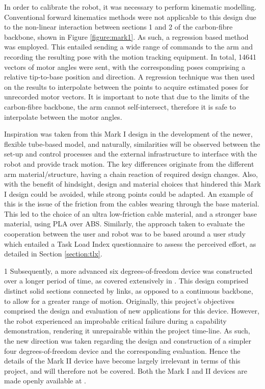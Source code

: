 \documentclass[11pt]{article}
\begin{document}
In order to calibrate the robot, it was necessary to perform kinematic modelling. Conventional forward
kinematics methods were not applicable to this design due to the non-linear interaction between sections 1 and 2
of the carbon-fibre backbone, shown in Figure \ref{figure:mark1}. As such, a regression based method was employed.
This entailed sending a wide range of commands to the arm and recording the resulting pose with the
motion tracking equipment. In total, 14641 vectors of motor angles were sent, with the corresponding
poses comprising a relative tip-to-base position and direction. A regression technique
was then used on the results to interpolate between the points to acquire estimated poses for unrecorded
motor vectors. It is important to note that due to the limits
of the carbon-fibre backbone, the arm cannot self-intersect, therefore it is safe to interpolate
between the motor angles.

Inspiration was taken from this Mark I design in the development of the newer, flexible tube-based model, and naturally, similarities will be observed between the set-up and control processes and the external infrastructure to interface with the robot and provide track motion. The key differences originate from the different arm material/structure, having a chain reaction of required design changes. Also, with the benefit of hindsight, design and material choices that hindered this Mark I design could be avoided, while strong points could be adapted. An example of this is the issue of the friction from the cables wearing through the base material. This led to the choice of an ultra low-friction cable material, and a stronger base material, using PLA over ABS. Similarly, the approach taken to evaluate the cooperation between the user and robot was to be based around a user study which entailed a Task Load Index questionnaire to assess the perceived effort, as detailed in Section \ref{section:tlx}.

1
Subsequently, a more advanced six degrees-of-freedom device was constructed over a longer period of time, as covered extensively in \cite{GreggSmithKinematics}. This design comprised distinct solid sections connected by links, as opposed to a continuous backbone, to allow for a greater range of motion. Originally, this project's objectives comprised the design and evaluation of new applications for this device. However, the robot experienced an improbable critical failure during a capability demonstration, rendering it unrepairable within the project time-line. As such, the new direction was taken regarding the design and construction of a simpler four degrees-of-freedom device and the corresponding evaluation. Hence the details of the Mark II device have become largely irrelevant in terms of this project, and will therefore not be covered. Both the Mark I and II devices are made openly available at \cite{handheldrobotics}.
\end{document}
